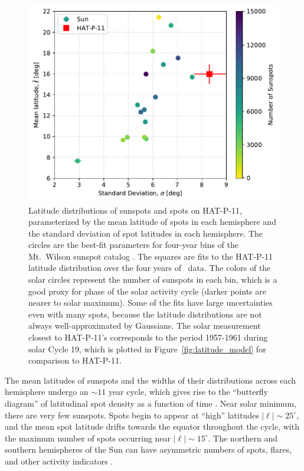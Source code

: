 \begin{figure}
\centering
\includegraphics[scale=0.6]{stsp_hat_p_11/sun_vs_hat11.pdf}
\caption{Latitude distributions of sunspots and spots on HAT-P-11, parameterized by the mean latitude of spots in each hemisphere and the standard deviation of spot latitudes in each hemisphere. The circles are the best-fit parameters for four-year bins of the Mt.~Wilson sunspot catalog \citep{Howard1984}. The squares are fits to the HAT-P-11 latitude distribution over the four years of \kepler\ data. The colors of the solar circles represent the number of sunspots in each bin, which is a good proxy for phase of the solar activity cycle (darker points are nearer to solar maximum). Some of the fits have large uncertainties even with many spots, because the latitude distributions are not always well-approximated by Gaussians. The solar measurement closest to HAT-P-11's corresponds to the period 1957-1961 during solar Cycle 19, which is plotted in Figure~\ref{fig:latitude_model} for comparison to HAT-P-11.}
\label{fig:sun_vs_hat11}
\end{figure}

The mean latitudes of sunspots and the widths of their distributions across each hemisphere undergo an $\sim 11$ year cycle, which gives rise to the ``butterfly diagram'' of latitudinal spot density as a function of time \citep[see for example][]{Hathaway2011, Hathaway2015}. Near solar minimum, there are very few sunspots. Spots begin to appear at ``high'' latitudes $\left | \ell \right |  \sim 25^\circ$, and the mean spot latitude drifts towards the equator throughout the cycle, with the maximum number of spots occurring near $\left | \ell \right | \sim 15^\circ$. The northern and southern hemispheres of the Sun can have asymmetric numbers of spots, flares, and other activity indicators \citep[see for example][]{Newton1955, Vizoso1990, Carbonell1993, Li2002}.

